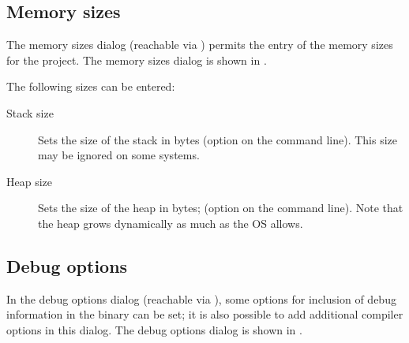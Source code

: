\subsection{Memory sizes}
The memory sizes dialog (reachable via ) permits
the entry of the memory sizes for the project.
The memory sizes dialog is shown in .


The following sizes can be entered:
\begin{description}
\item[Stack size] Sets the size of the stack in bytes
(option  on the command line). This size may be ignored on some
systems.
\item[Heap size] Sets the size of the heap in bytes; (option  on
the command line). Note that the heap grows dynamically as much as the OS
allows.
\end{description}

%
%
\subsection{Debug options}
\label{se:debugoptions}
In the debug options dialog (reachable via ), some 
options for inclusion of debug information in the binary can be set; 
it is also possible to add additional compiler options in this dialog.
The debug options dialog is shown in .

